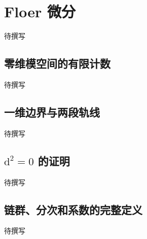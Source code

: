 
% 
% 
% 

\section{Floer 微分}
\label{g4:sec:2605}

待撰写

\subsection{零维模空间的有限计数}
\label{g4:subsec:2605:01}
待撰写

\subsection{一维边界与两段轨线}
\label{g4:subsec:2605:02}
待撰写

\subsection{\texorpdfstring{\(\mathrm{d}^2=0\) 的证明}{d²=0 的证明}}
\label{g4:subsec:2605:03}
待撰写

\subsection{链群、分次和系数的完整定义}
\label{g4:subsec:2605:04}
待撰写

